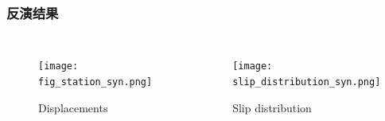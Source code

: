 ﻿\documentclass{beamer}
\begin{document}
\begin{frame}
\frametitle{反演结果}
\begin{columns}

\begin{minipage}[c][0.4\textheight][c]{\linewidth}
\begin{figure}
  \centering
  \texttt{[image: fig\_station\_syn.png]}\\
  \caption{Displacements}\label{fig_station_syn}
\end{figure}
\end{minipage}

\begin{minipage}[c][0.4\textheight][c]{\linewidth}
\begin{figure}
  \centering
  \texttt{[image: slip\_distribution\_syn.png]}\\
  \caption{Slip distribution}\label{Fig:slip_distribution_syn}
\end{figure}
\end{minipage}

\end{columns}

\end{frame}
\end{document}
